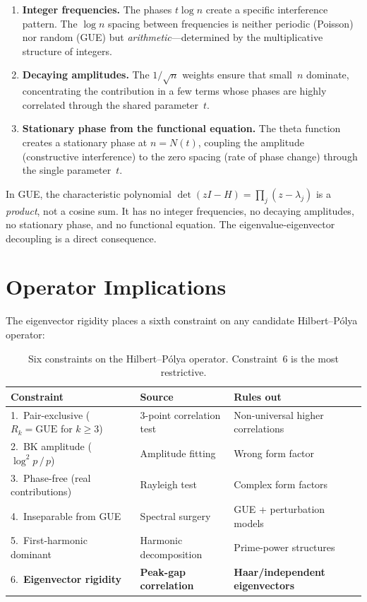 \documentclass[11pt,a4paper]{article}
\begin{document}
\begin{enumerate}[nosep]
\item \textbf{Integer frequencies.}
The phases $t\log n$ create a specific interference pattern.
The $\log n$ spacing between frequencies is neither periodic (Poisson) nor random (GUE) but \emph{arithmetic}---determined by the multiplicative structure of integers.

\item \textbf{Decaying amplitudes.}
The $1/\!\sqrt{n}$ weights ensure that small~$n$ dominate, concentrating the contribution in a few terms whose phases are highly correlated through the shared parameter~$t$.

\item \textbf{Stationary phase from the functional equation.}
The theta function creates a stationary phase at $n = N(t)$, coupling the amplitude (constructive interference) to the zero spacing (rate of phase change) through the single parameter~$t$.
\end{enumerate}

In GUE, the characteristic polynomial $\det(zI - H) = \prod_j(z - \lambda_j)$ is a \emph{product}, not a cosine sum.
It has no integer frequencies, no decaying amplitudes, no stationary phase, and no functional equation.
The eigenvalue-eigenvector decoupling is a direct consequence.

\section{Operator Implications}

The eigenvector rigidity places a sixth constraint on any candidate Hilbert--P\'olya operator:

\begin{table}[ht]
\centering
\small
\begin{tabular}{@{}p{5.5cm}p{3.5cm}p{4.5cm}@{}}
\toprule
Constraint & Source & Rules out \\
\midrule
1.\ Pair-exclusive ($R_k = \text{GUE}$ for $k \ge 3$) & 3-point correlation test & Non-universal higher correlations \\
2.\ BK amplitude ($\log^2 p\,/\,p$) & Amplitude fitting & Wrong form factor \\
3.\ Phase-free (real contributions) & Rayleigh test & Complex form factors \\
4.\ Inseparable from GUE & Spectral surgery & GUE + perturbation models \\
5.\ First-harmonic dominant & Harmonic decomposition & Prime-power structures \\
6.\ \textbf{Eigenvector rigidity} & \textbf{Peak-gap correlation} & \textbf{Haar/independent eigenvectors} \\
\bottomrule
\end{tabular}
\caption{Six constraints on the Hilbert--P\'olya operator. Constraint~6 is the most restrictive.}
\label{tab:constraints}
\end{table}
\end{document}
